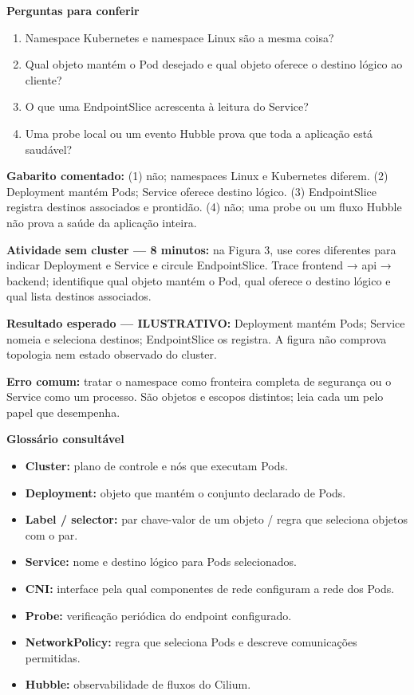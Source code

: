 \documentclass[12pt,openany,oneside,a4paper,chapter=TITLE,english,brazil]{abntex2}
\providecommand{\tightlist}{\setlength{\itemsep}{0pt}\setlength{\parskip}{0pt}}
\begin{document}
\textbf{Perguntas para conferir}

\begin{enumerate}
\def\labelenumi{\arabic{enumi}.}
\tightlist
\item
  Namespace Kubernetes e namespace Linux são a mesma coisa?
\item
  Qual objeto mantém o Pod desejado e qual objeto oferece o destino lógico ao cliente?
\item
  O que uma EndpointSlice acrescenta à leitura do Service?
\item
  Uma probe local ou um evento Hubble prova que toda a aplicação está saudável?
\end{enumerate}

\textbf{Gabarito comentado:} (1) não; namespaces Linux e Kubernetes diferem. (2) Deployment mantém Pods; Service oferece destino lógico. (3) EndpointSlice registra destinos associados e prontidão. (4) não; uma probe ou um fluxo Hubble não prova a saúde da aplicação inteira.

\textbf{Atividade sem cluster --- 8 minutos:} na Figura 3, use cores diferentes para indicar Deployment e Service e circule EndpointSlice. Trace frontend → api → backend; identifique qual objeto mantém o Pod, qual oferece o destino lógico e qual lista destinos associados.

\textbf{Resultado esperado --- ILUSTRATIVO:} Deployment mantém Pods; Service nomeia e seleciona destinos; EndpointSlice os registra. A figura não comprova topologia nem estado observado do cluster.

\textbf{Erro comum:} tratar o namespace como fronteira completa de segurança ou o Service como um processo. São objetos e escopos distintos; leia cada um pelo papel que desempenha.

\textbf{Glossário consultável}

\begin{itemize}
\tightlist
\item
  \textbf{Cluster:} plano de controle e nós que executam Pods.
\item
  \textbf{Deployment:} objeto que mantém o conjunto declarado de Pods.
\item
  \textbf{Label / selector:} par chave-valor de um objeto / regra que seleciona objetos com o par.
\item
  \textbf{Service:} nome e destino lógico para Pods selecionados.
\item
  \textbf{CNI:} interface pela qual componentes de rede configuram a rede dos Pods.
\item
  \textbf{Probe:} verificação periódica do endpoint configurado.
\item
  \textbf{NetworkPolicy:} regra que seleciona Pods e descreve comunicações permitidas.
\item
  \textbf{Hubble:} observabilidade de fluxos do Cilium.
\end{itemize}
\end{document}
